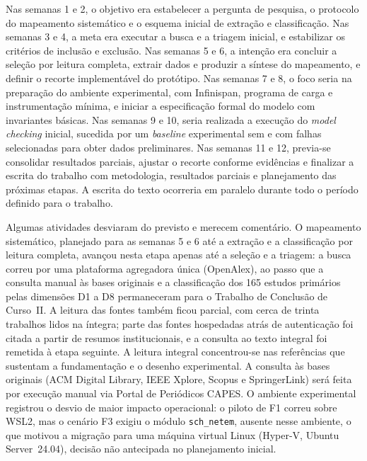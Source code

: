 Nas semanas 1 e 2, o objetivo era estabelecer a pergunta de pesquisa, o protocolo do mapeamento sistemático e o esquema inicial de extração e classificação. Nas semanas 3 e 4, a meta era executar a busca e a triagem inicial, e estabilizar os critérios de inclusão e exclusão. Nas semanas 5 e 6, a intenção era concluir a seleção por leitura completa, extrair dados e produzir a síntese do mapeamento, e definir o recorte implementável do protótipo. Nas semanas 7 e 8, o foco seria na preparação do ambiente experimental, com Infinispan, programa de carga e instrumentação mínima, e iniciar a especificação formal do modelo com invariantes básicas. Nas semanas 9 e 10, seria realizada a execução do \emph{model checking} inicial, sucedida por um \emph{baseline} experimental sem e com falhas selecionadas para obter dados preliminares. Nas semanas 11 e 12, previa-se consolidar resultados parciais, ajustar o recorte conforme evidências e finalizar a escrita do trabalho com metodologia, resultados parciais e planejamento das próximas etapas. A escrita do texto ocorreria em paralelo durante todo o período definido para o trabalho.



Algumas atividades desviaram do previsto e merecem comentário. O mapeamento sistemático, planejado para as semanas 5 e 6 até a extração e a classificação por leitura completa, avançou nesta etapa apenas até a seleção e a triagem: a busca correu por uma plataforma agregadora única (OpenAlex), ao passo que a consulta manual às bases originais e a classificação dos 165 estudos primários pelas dimensões D1 a D8 permaneceram para o Trabalho de Conclusão de Curso~II. A leitura das fontes também ficou parcial, com cerca de trinta trabalhos lidos na íntegra; parte das fontes hospedadas atrás de autenticação foi citada a partir de resumos institucionais, e a consulta ao texto integral foi remetida à etapa seguinte. A leitura integral concentrou-se nas referências que sustentam a fundamentação e o desenho experimental. A consulta às bases originais (ACM Digital Library, IEEE Xplore, Scopus e SpringerLink) será feita por execução manual via Portal de Periódicos CAPES. O ambiente experimental registrou o desvio de maior impacto operacional: o piloto de F1 correu sobre WSL2, mas o cenário F3 exigiu o módulo \texttt{sch\_netem}, ausente nesse ambiente, o que motivou a migração para uma máquina virtual Linux (Hyper-V, Ubuntu Server~24.04), decisão não antecipada no planejamento inicial.

